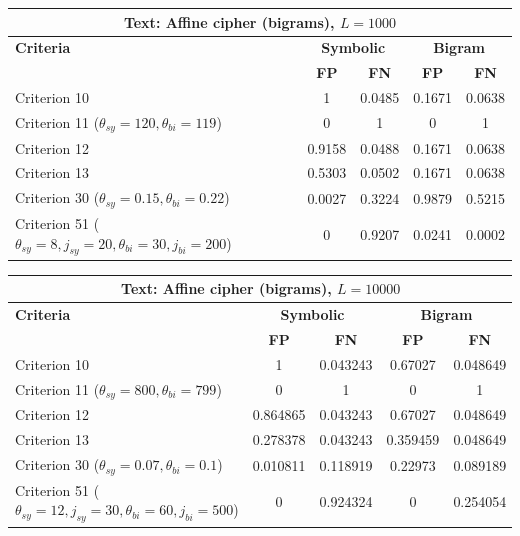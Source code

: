 \begin{center}
\renewcommand{\arraystretch}{1.2}
\setlength{\tabcolsep}{6pt}
\begin{tabular}{|l||c|c||c|c|}
\hline
\multicolumn{5}{|c|}{\textbf{Text: Affine cipher (bigrams), $L=1000$}} \\
\hline
\textbf{Criteria} & \multicolumn{2}{c||}{\textbf{Symbolic}} & \multicolumn{2}{c|}{\textbf{Bigram}} \\
\hline
 & \textbf{FP} & \textbf{FN} & \textbf{FP} & \textbf{FN} \\
\hline
Criterion 10 & 1 & 0.0485 & 0.1671 & 0.0638 \\
Criterion 11 ($\theta_{sy}=120, \theta_{bi}=119$) & 0 & 1 & 0 & 1 \\
Criterion 12 & 0.9158 & 0.0488 & 0.1671 & 0.0638 \\
Criterion 13 & 0.5303 & 0.0502 & 0.1671 & 0.0638 \\
Criterion 30 ($\theta_{sy}=0.15, \theta_{bi}=0.22$) & 0.0027 & 0.3224 & 0.9879 & 0.5215 \\
Criterion 51 ($\theta_{sy}=8, j_{sy}=20, \theta_{bi}=30, j_{bi}=200$) & 0 & 0.9207 & 0.0241 & 0.0002 \\
\hline
\end{tabular}
\end{center}

\begin{center}
\renewcommand{\arraystretch}{1.2}
\setlength{\tabcolsep}{6pt}
\begin{tabular}{|l||c|c||c|c|}
\hline
\multicolumn{5}{|c|}{\textbf{Text: Affine cipher (bigrams), $L=10000$}} \\
\hline
\textbf{Criteria} & \multicolumn{2}{c||}{\textbf{Symbolic}} & \multicolumn{2}{c|}{\textbf{Bigram}} \\
\hline
 & \textbf{FP} & \textbf{FN} & \textbf{FP} & \textbf{FN} \\
\hline
Criterion 10 & 1 & 0.043243 & 0.67027 & 0.048649 \\
Criterion 11 ($\theta_{sy}=800, \theta_{bi}=799$) & 0 & 1 & 0 & 1 \\
Criterion 12 & 0.864865 & 0.043243 & 0.67027 & 0.048649 \\
Criterion 13 & 0.278378 & 0.043243 & 0.359459 & 0.048649 \\
Criterion 30 ($\theta_{sy}=0.07, \theta_{bi}=0.1$) & 0.010811 & 0.118919 & 0.22973 & 0.089189 \\
Criterion 51 ($\theta_{sy}=12, j_{sy}=30, \theta_{bi}=60, j_{bi}=500$) & 0 & 0.924324 & 0 & 0.254054 \\
\hline
\end{tabular}
\end{center}

